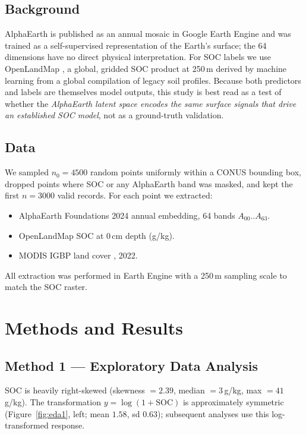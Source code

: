 \documentclass[11pt]{article}
\begin{document}
\subsection{Background}
AlphaEarth is published as an annual mosaic in Google Earth Engine
\cite{gorelick2017gee} and was trained as a self-supervised representation of
the Earth's surface; the 64 dimensions have no direct physical interpretation.
For SOC labels we use OpenLandMap \cite{hengl2017openlandmap}, a global,
gridded SOC product at 250\,m derived by machine learning from a global
compilation of legacy soil profiles. Because both predictors and labels are
themselves model outputs, this study is best read as a test of whether the
\emph{AlphaEarth latent space encodes the same surface signals that drive an
established SOC model}, not as a ground-truth validation.

\subsection{Data}
We sampled $n_{0} = 4500$ random points uniformly within a CONUS bounding
box, dropped points where SOC or any AlphaEarth band was masked, and kept
the first $n = 3000$ valid records. For each point we extracted:
\begin{itemize}
\item AlphaEarth Foundations 2024 annual embedding, 64 bands $A_{00}..A_{63}$.
\item OpenLandMap SOC at 0\,cm depth (g/kg).
\item MODIS IGBP land cover \cite{friedl2010modis}, 2022.
\end{itemize}
All extraction was performed in Earth Engine with a 250\,m sampling scale to
match the SOC raster.

\section{Methods and Results}

\subsection{Method 1 --- Exploratory Data Analysis}
SOC is heavily right-skewed (skewness $= 2.39$, median $= 3$\,g/kg, max
$= 41$\,g/kg). The transformation $y = \log(1+\mathrm{SOC})$ is approximately
symmetric (Figure~\ref{fig:eda1}, left; mean $1.58$, sd $0.63$); subsequent
analyses use this log-transformed response.
\end{document}
